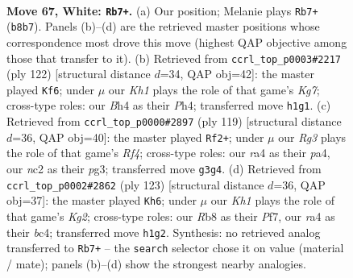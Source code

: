 \documentclass[11pt]{article}
\begin{document}
\clearpage

\begin{figure}[p]\centering
\begin{subfigure}{0.46\textwidth}\centering
\resizebox{\linewidth}{!}{%
\newchessgame
\chessboard[
  setfen={1R6/7k/7r/8/r5bB/6R1/2n2P2/7K w - - 13 67},
  showmover=false,
  pgfstyle=straightmove, color=movearrow, markmove={b8-b7}
]}
\caption{}
\end{subfigure}\hfill
\begin{subfigure}{0.46\textwidth}\centering
\resizebox{\linewidth}{!}{%
\newchessgame
\chessboard[
  setfen={8/6K1/8/3k2B1/4b1rP/4R3/8/8 w - - 17 62},
  showmover=false,
  pgfstyle=straightmove, color=movearrow, markmove={g7-f6}
]}
\caption{}
\end{subfigure}
\\[4pt]
\begin{subfigure}{0.46\textwidth}\centering
\resizebox{\linewidth}{!}{%
\newchessgame
\chessboard[
  setfen={8/5B2/7k/R1b2r2/P5p1/6P1/4K3/8 b - - 0 60},
  showmover=false,
  pgfstyle=straightmove, color=movearrow, markmove={f5-f2}
]}
\caption{}
\end{subfigure}\hfill
\begin{subfigure}{0.46\textwidth}\centering
\resizebox{\linewidth}{!}{%
\newchessgame
\chessboard[
  setfen={8/5pk1/2n5/6b1/2B5/4r3/1PK1N3/6R1 b - - 13 62},
  showmover=false,
  pgfstyle=straightmove, color=movearrow, markmove={g7-h6}
]}
\caption{}
\end{subfigure}
\caption{\textbf{Move 67, White: \texttt{Rb7+}.} (a) Our position; Melanie plays \texttt{Rb7+} (\texttt{b8b7}). Panels (b)--(d) are the retrieved master positions whose correspondence most drove this move (highest QAP objective among those that transfer to it). (b) Retrieved from \texttt{ccrl\_top\_p0003\#2217} (ply 122) [structural distance $d$=34, QAP obj=42]: the master played \texttt{Kf6}; under $\mu$ our \emph{Kh1} plays the role of that game's \emph{Kg7}; cross-type roles: our \emph{B}h4 as their \emph{P}h4; transferred move \texttt{h1g1}. (c) Retrieved from \texttt{ccrl\_top\_p0000\#2897} (ply 119) [structural distance $d$=36, QAP obj=40]: the master played \texttt{Rf2+}; under $\mu$ our \emph{Rg3} plays the role of that game's \emph{Rf4}; cross-type roles: our \emph{r}a4 as their \emph{p}a4, our \emph{n}c2 as their \emph{p}g3; transferred move \texttt{g3g4}. (d) Retrieved from \texttt{ccrl\_top\_p0002\#2862} (ply 123) [structural distance $d$=36, QAP obj=37]: the master played \texttt{Kh6}; under $\mu$ our \emph{Kh1} plays the role of that game's \emph{Kg2}; cross-type roles: our \emph{R}b8 as their \emph{P}f7, our \emph{r}a4 as their \emph{b}c4; transferred move \texttt{h1g2}. Synthesis: no retrieved analog transferred to \texttt{Rb7+} -- the \texttt{search} selector chose it on value (material / mate); panels (b)--(d) show the strongest nearby analogies.}
\label{fig:thought-m132}
\end{figure}
\end{document}
